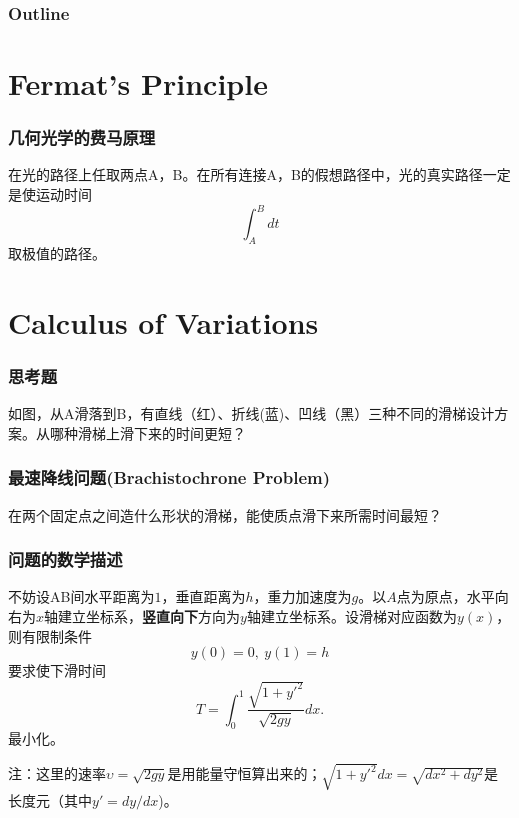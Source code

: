 \documentclass[CJK]{beamer}
\date{}
\begin{document}
  \bch
  

\begin{frame}
\frametitle{Outline}
\tableofcontents
\end{frame}


\section{Fermat's Principle}

\begin{frame}
  \frametitle{几何光学的费马原理}
  在光的路径上任取两点A，B。在所有连接A，B的假想路径中，光的真实路径一定是使运动时间
  $$\int_A^B dt$$
  取极值的路径。

  \skipline

\end{frame}



\section{Calculus of Variations}

\begin{frame}
  \frametitle{思考题}
  

  如图，从A滑落到B，有直线（红）、折线(蓝)、凹线（黑）三种不同的滑梯设计方案。从哪种滑梯上滑下来的时间更短？

\end{frame}

\begin{frame}
  \frametitle{最速降线问题(Brachistochrone Problem)}
  在两个固定点之间造什么形状的滑梯，能使质点滑下来所需时间最短？
\end{frame}



\begin{frame}
  \frametitle{问题的数学描述}
  不妨设AB间水平距离为$1$，垂直距离为$h$，重力加速度为$g$。以$A$点为原点，水平向右为$x$轴建立坐标系，{\bf 竖直向下}方向为$y$轴建立坐标系。设滑梯对应函数为$y(x)$，则有限制条件
  $$ y(0) = 0, \ y(1) = h$$
  要求使下滑时间
  $$T =  \int_0^1 \frac{\sqrt{1+y'^2}}{\sqrt{2gy}}dx. $$
  最小化。

  \emini
  {\scriptsize
    注：这里的速率$\upsilon=\sqrt{2gy}$是用能量守恒算出来的；$\sqrt{1+y'^2}dx=\sqrt{dx^2+dy^2}$是长度元（其中$y'=dy/dx$)。}
  \emini
\end{frame}
\end{document}
